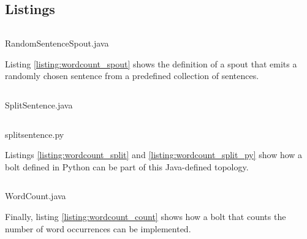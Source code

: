 \documentclass[bsc,logo,frontabs,twoside,singlespacing,normalheadings,parskip]{infthesis}\usepackage[]{graphicx}\usepackage[]{color}
\begin{document}
\begin{appendices}
	\clearpage{}\chapter{Listings}
\label{ch:listings}

\begin{listing}[!htb]
\inputminted{java}{code/RandomSentenceSpout.java}
\caption{RandomSentenceSpout.java}
\label{listing:wordcount_spout}
\end{listing}

Listing \ref{listing:wordcount_spout} shows the definition of a spout that emits a randomly chosen sentence from a predefined collection of sentences.

\begin{listing}[!htb]
\inputminted{java}{code/SplitSentence.java}
\caption{SplitSentence.java}
\label{listing:wordcount_split}
\end{listing}

\begin{listing}[!htb]
\inputminted{python}{code/splitsentence.py}
\caption{splitsentence.py}
\label{listing:wordcount_split_py}
\end{listing}

Listings \ref{listing:wordcount_split} and \ref{listing:wordcount_split_py} show how a bolt defined in Python can be part of this Java-defined topology.

\begin{listing}[!htb]
\inputminted{java}{code/WordCount.java}
\caption{WordCount.java}
\label{listing:wordcount_count}
\end{listing}

Finally, listing \ref{listing:wordcount_count} shows how a bolt that counts the number of word occurrences can be implemented.

\clearpage{}
\end{appendices}


\printbibliography
\end{document}
